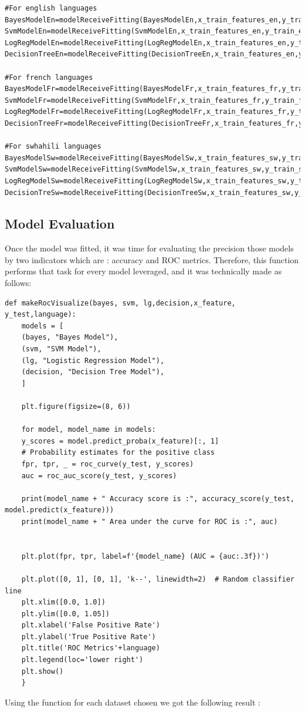\documentclass[12pt,a4paper, oneside]{book}
\begin{document}
\begin{lstlisting}[style=stylejupyter]
#For english languages
BayesModelEn=modelReceiveFitting(BayesModelEn,x_train_features_en,y_train_en) 
SvmModelEn=modelReceiveFitting(SvmModelEn,x_train_features_en,y_train_en) 
LogRegModelEn=modelReceiveFitting(LogRegModelEn,x_train_features_en,y_train_en) 
DecisionTreeEn=modelReceiveFitting(DecisionTreeEn,x_train_features_en,y_train_en) 

#For french languages
BayesModelFr=modelReceiveFitting(BayesModelFr,x_train_features_fr,y_train_fr)
SvmModelFr=modelReceiveFitting(SvmModelFr,x_train_features_fr,y_train_fr) 
LogRegModelFr=modelReceiveFitting(LogRegModelFr,x_train_features_fr,y_train_fr) 
DecisionTreeFr=modelReceiveFitting(DecisionTreeFr,x_train_features_fr,y_train_fr) 

#For swhahili languages
BayesModelSw=modelReceiveFitting(BayesModelSw,x_train_features_sw,y_train_sw)
SvmModelSw=modelReceiveFitting(SvmModelSw,x_train_features_sw,y_train_sw) 
LogRegModelSw=modelReceiveFitting(LogRegModelSw,x_train_features_sw,y_train_sw) 
DecisionTreSw=modelReceiveFitting(DecisionTreeSw,x_train_features_sw,y_train_sw)
\end{lstlisting}
\subsection{Model Evaluation}

Once the model was fitted, it was time for evaluating the precision those models by two indicators which are : accuracy and ROC metrics. Therefore, this function performs that task for every model leveraged, and it was technically made as follows: 
\begin{lstlisting}[style=stylejupyter]
def makeRocVisualize(bayes, svm, lg,decision,x_feature, y_test,language):
	models = [
	(bayes, "Bayes Model"),
	(svm, "SVM Model"),
	(lg, "Logistic Regression Model"),
	(decision, "Decision Tree Model"),
	]
	
	plt.figure(figsize=(8, 6))
	
	for model, model_name in models:
	y_scores = model.predict_proba(x_feature)[:, 1]  
	# Probability estimates for the positive class
	fpr, tpr, _ = roc_curve(y_test, y_scores)
	auc = roc_auc_score(y_test, y_scores)
	
	print(model_name + " Accuracy score is :", accuracy_score(y_test, model.predict(x_feature)))
    print(model_name + " Area under the curve for ROC is :", auc) 

	
	plt.plot(fpr, tpr, label=f'{model_name} (AUC = {auc:.3f})')
	
	plt.plot([0, 1], [0, 1], 'k--', linewidth=2)  # Random classifier line
	plt.xlim([0.0, 1.0])
	plt.ylim([0.0, 1.05])
	plt.xlabel('False Positive Rate')
	plt.ylabel('True Positive Rate')
	plt.title('ROC Metrics'+language)
	plt.legend(loc='lower right')
	plt.show()
	}
\end{lstlisting}
Using the function for each dataset chosen we got the following result :
\end{document}
